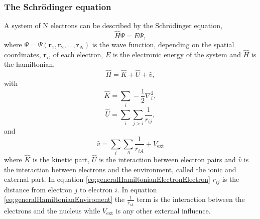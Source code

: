 \subsubsection{The Schr\"odinger equation}
\label{sec:schrodinger}
A system of N electrons can be described by the Schr\"odinger equation,
\begin{equation}
\label{eq:schrodingerBasic}
 \widehat{H}\Psi = E \Psi,
\end{equation}
where $\Psi = \Psi(\textbf{r}_{1}, \textbf{r}_{2}, ... ,\textbf{r}_{N})$ is the wave function, depending on the spatial coordinates, $\textbf{r}_{i}$, of each electron, $E$ is the electronic energy of the system and $\widehat{H}$ is the hamiltonian,
\begin{equation}
 \widehat{H} = \widehat{K} + \widehat{U} + \widehat{v},
 \label{eq:generalHamiltonian}
\end{equation}
with
\begin{equation}
 \widehat{K} = \displaystyle\sum_{{i}} - \frac{1}{2}\nabla^2_{i}
 \label{eq:generalHamiltonianKinetic},
\end{equation}
\begin{equation}
 \widehat{U} = \displaystyle\sum_{{i}}\sum_{{j}>{i}}\frac{1}{r_{ij}}
 \label{eq:generalHamiltonianElectronElectron},
\end{equation}
and
\begin{equation}
 \widehat{v} = \displaystyle\sum_{i}\sum_{A}\frac{1}{r_{iA}} + V_\mathrm{ext}
 \label{eq:generalHamiltonianEnviroment}
\end{equation}
where $\widehat{K}$ is the kinetic part, $\widehat{U}$ is the interaction between electron pairs and $\widehat{v}$ is the interaction between electrons and the environment, called the ionic and external part. In equation \ref{eq:generalHamiltonianElectronElectron} $r_{ij}$ is the distance from electron $j$ to electron $i$. In equation \ref{eq:generalHamiltonianEnviroment} the $\frac{1}{r_{iA}}$ term is the interaction between the electrons and the nucleus while $V_\mathrm{ext}$ is any other external influence. 

